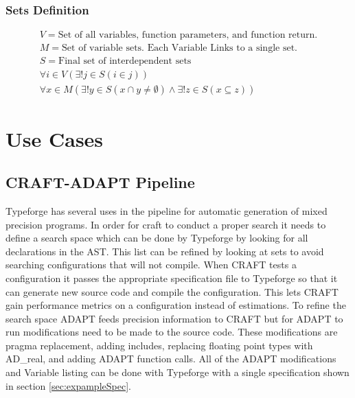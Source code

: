 \documentclass[natbib]{article}
\begin{document}
\subsubsection{Sets Definition} \label{sec:setDef}
\begin{gather} 
V = \text{Set of all variables, function parameters, and function return.}\\
M = \text{Set of variable sets. Each Variable Links to a single set.}\\
S = \text{Final set of interdependent sets}\\
\forall i \in V(\exists! j \in S(i \in j))\\
\forall x \in M(\exists! y \in S(x \cap y \neq \emptyset) \wedge 
\exists! z \in S(x \subseteq z))
\end{gather}
\section{Use Cases}
\subsection{CRAFT-ADAPT Pipeline}\label{sec:pipeline}
\noindent
Typeforge has several uses in the pipeline for automatic generation of mixed precision programs.
In order for craft to conduct a proper search it needs to define 
a search space which can be done by Typeforge by looking for all declarations in the AST. This 
list can be refined by looking at sets to avoid searching configurations that will not compile. 
When CRAFT tests a configuration it passes the appropriate specification file to Typeforge so 
that it can generate new source code and compile the configuration. This lets CRAFT gain 
performance metrics on a configuration instead of estimations. To refine the search space ADAPT 
feeds precision information to CRAFT but for ADAPT to run modifications need to be made to the 
source code. These modifications are pragma replacement, adding includes, replacing floating point 
types with AD\_real, and adding ADAPT function calls. All of the ADAPT modifications and Variable 
listing can be done with Typeforge with a single specification shown in section \ref{sec:expampleSpec}.


\end{document}
